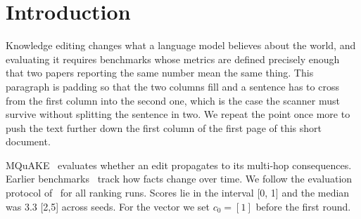 \documentclass[twocolumn]{article}
\begin{document}
\section{Introduction}
Knowledge editing changes what a language model believes about the world, and evaluating it requires benchmarks whose metrics are defined precisely enough that two papers reporting the same number mean the same thing.
This paragraph is padding so that the two columns fill and a sentence has to cross from the first column into the second one, which is the case the scanner must survive without splitting the sentence in two.
We repeat the point once more to push the text further down the first column of the first page of this short document.

MQuAKE~\cite{zhong2023mquake} evaluates whether an edit propagates to its multi-hop consequences.
Earlier benchmarks~\cite{jang2022temporalwiki,cover2006elements,smith2020first} track how facts change over time.
We follow the evaluation protocol of~\cite{bao2023tallrec} for all ranking runs.
Scores lie in the interval [0, 1] and the median was 3.3 [2,5] across seeds.
For the vector we set $c_0 = [1]$ before the first round.


\end{document}
